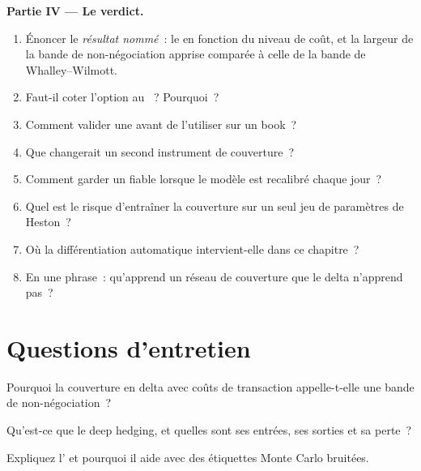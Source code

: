 \begin{problem}
\medskip\noindent\textbf{Partie IV --- Le verdict.}
\begin{enumerate}[resume]
\item Énoncer le \emph{résultat nommé}~: le  en fonction du niveau de coût, et la largeur de la bande de non-négociation apprise
comparée à celle de la bande de Whalley--Wilmott.
\item Faut-il coter l'option au ~? Pourquoi~?
\item Comment valider une  avant de l'utiliser sur un book~?
\item Que changerait un second instrument de couverture~?
\item Comment garder un  fiable lorsque le modèle est recalibré chaque jour~?
\item Quel est le risque d'entraîner la couverture sur un seul jeu de paramètres de Heston~?
\item Où la différentiation automatique intervient-elle dans ce chapitre~?
\item En une phrase~: qu'apprend un réseau de couverture que le delta n'apprend pas~?
\end{enumerate}
\end{problem}

\section{Questions d'entretien}

\begin{interviewq}\label{iq:ml:deep-hedging-and-machine-learning-in-pricing:1}
Pourquoi la couverture en delta avec coûts de transaction appelle-t-elle une bande de non-négociation~?
\end{interviewq}

\begin{interviewq}\label{iq:ml:deep-hedging-and-machine-learning-in-pricing:2}
Qu'est-ce que le deep hedging, et quelles sont ses entrées, ses sorties et sa perte~?
\end{interviewq}

\begin{interviewq}\label{iq:ml:deep-hedging-and-machine-learning-in-pricing:3}
Expliquez l' et pourquoi il aide avec des étiquettes Monte Carlo bruitées.
\end{interviewq}

